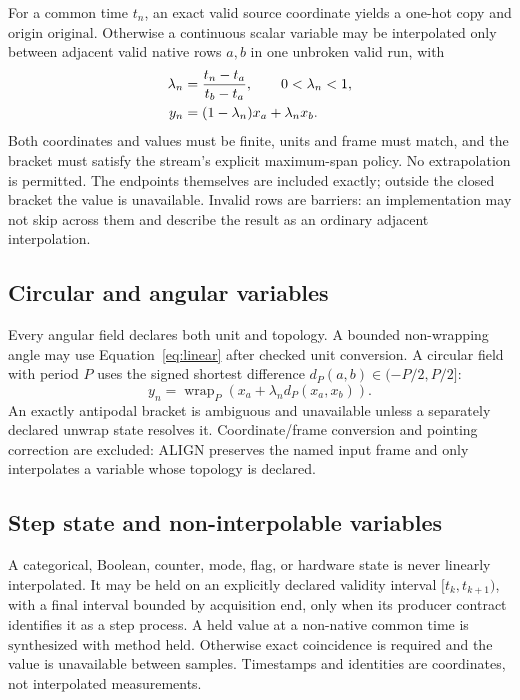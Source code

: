 \documentclass[11pt]{article}
\newcommand{\state}[1]{\mathrm{#1}}
\begin{document}
For a common time \(t_n\), an exact valid source coordinate yields a one-hot
copy and origin \(\state{original}\).  Otherwise a continuous scalar variable
may be interpolated only between adjacent valid native rows \(a,b\) in one
unbroken valid run, with
\begin{align}
 \lambda_n&=\frac{t_n-t_a}{t_b-t_a},\qquad 0<\lambda_n<1,\notag\\
 y_n&=(1-\lambda_n)x_a+\lambda_n x_b.
 \label{eq:linear}
\end{align}
Both coordinates and values must be finite, units and frame must match, and
the bracket must satisfy the stream's explicit maximum-span policy.  No
extrapolation is permitted.  The endpoints themselves are included exactly;
outside the closed bracket the value is unavailable.  Invalid rows are
barriers: an implementation may not skip across them and describe the result
as an ordinary adjacent interpolation.

\subsection{Circular and angular variables}

Every angular field declares both unit and topology.  A bounded non-wrapping
angle may use Equation~\eqref{eq:linear} after checked unit conversion.  A
circular field with period \(P\) uses the signed shortest difference
\(d_P(a,b)\in(-P/2,P/2]\):
\begin{equation}
 y_n=\operatorname{wrap}_P\!\left(x_a+\lambda_n d_P(x_a,x_b)\right).
 \label{eq:circular}
\end{equation}
An exactly antipodal bracket is ambiguous and unavailable unless a separately
declared unwrap state resolves it.  Coordinate/frame conversion and pointing
correction are excluded: ALIGN preserves the named input frame and only
interpolates a variable whose topology is declared.

\subsection{Step state and non-interpolable variables}

A categorical, Boolean, counter, mode, flag, or hardware state is never
linearly interpolated.  It may be held on an explicitly declared validity
interval \([t_k,t_{k+1})\), with a final interval bounded by acquisition end,
only when its producer contract identifies it as a step process.  A held
value at a non-native common time is \(\state{synthesized}\) with method
\(\state{held}\).  Otherwise exact coincidence is required and the value is
unavailable between samples.  Timestamps and identities are coordinates, not
interpolated measurements.
\end{document}
